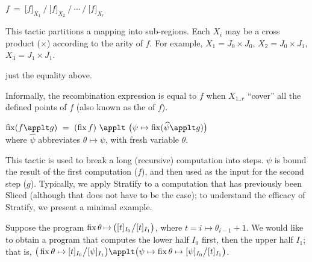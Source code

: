 \label{tactics:Slice}
$f ~=~ \big[f\big]_{X_1} ~\Big/~ \big[f\big]_{X_2} ~\Big/ ~\cdots~ \Big/~ \big[f\big]_{X_r}$\hspace{2mm}

This tactic partitions a mapping into sub-regions. Each $X_i$ may be a cross product ($\times$)
according to the arity of $f$.%
\cbstart{}
For example, $X_1=J_0\times J_0$, $X_2=J_0\times J_1$, $X_3=J_1\times J_1$.
\cbend

\Obligations \cbstart{}just the equality above.
\cbend

Informally, the recombination expression is equal to $f$
when $X_{1..r}$ ``cover'' all the defined points of $f$ (also known as the  of $f$).

\medskip
{}
$\fix (f\applt g) ~=~ (\fix f) ~\applt~ \big(\psi\mapsto \fix (\widehat\psi\applt g)\big)$
\\
where $\widehat\psi$ abbreviates $\theta\mapsto\psi$, with fresh variable $\theta$.

\cbstart{}%
This tactic is used to break a long (recursive) computation into steps. $\psi$ is bound the result of the first computation ($f$), and then used as the input for the second step ($g$).
Typically, we apply \textsf{Stratify} to a computation that has previously been \textsf{Slice}d (although that does not have to be the case); to understand the efficacy of \textsf{Stratify}, we present a minimal example.

Suppose the program $\operatorname{fix} \theta{\,\mapsto\,}\big([t]_{I_0}\big/[t]_{I_1}\big)$, where $t=i\mapsto\theta_{i-1}+1$.
We would like to obtain a program that computes the lower half $I_0$ first, then the upper half $I_1$; that is, 
$\big(\fix\theta\mapsto[t]_{I_0}\big/[\psi]_{I_1}\big) \applt
  \big(\psi \mapsto \fix\theta\mapsto[\psi]_{I_0}\big/[t]_{I_1}\big)$.

